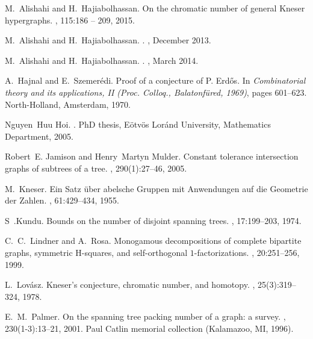 \documentclass[11pt]{article}
\begin{document}
\begin{thebibliography}{10}

M.~Alishahi and H.~Hajiabolhassan.
\newblock On the chromatic number of general Kneser hypergraphs.
, 115:186 -- 209,
  2015.

M.~{Alishahi} and H.~{Hajiabolhassan}.
.
, December 2013.

M.~{Alishahi} and H.~{Hajiabolhassan}.
.
, March 2014.

A.~Hajnal and E.~Szemer{\'e}di.
\newblock Proof of a conjecture of {P}. {E}rd{\H o}s.
\newblock In {\em Combinatorial theory and its applications, {II} ({P}roc.
  {C}olloq., {B}alatonf\"ured, 1969)}, pages 601--623. North-Holland,
  Amsterdam, 1970.

Nguyen~Huu Hoi.
.
\newblock PhD thesis, E{\" o}tv{\" o}s Lor{\'a}nd University, Mathematics
  Department, 2005.

Robert~E. Jamison and Henry~Martyn Mulder.
\newblock Constant tolerance intersection graphs of subtrees of a tree.
, 290(1):27--46, 2005.

M.~Kneser.
\newblock Ein {S}atz \"uber abelsche {G}ruppen mit {A}nwendungen auf die
  {G}eometrie der {Z}ahlen.
, 61:429--434, 1955.

S~.Kundu.
\newblock Bounds on the number of disjoint spanning trees.
, 17:199--203, 1974.

C.~C.~Lindner and A.~Rosa.
\newblock Monogamous decompositions of complete bipartite graphs, symmetric
  {H}-squares, and self-orthogonal {$1$}-factorizations.
, 20:251--256, 1999.

L.~Lov{\'a}sz.
\newblock Kneser's conjecture, chromatic number, and homotopy.
, 25(3):319--324, 1978.

E.~M.~Palmer.
\newblock On the spanning tree packing number of a graph: a survey.
, 230(1-3):13--21, 2001.
\newblock Paul Catlin memorial collection (Kalamazoo, MI, 1996).


\end{thebibliography}
\end{document}
